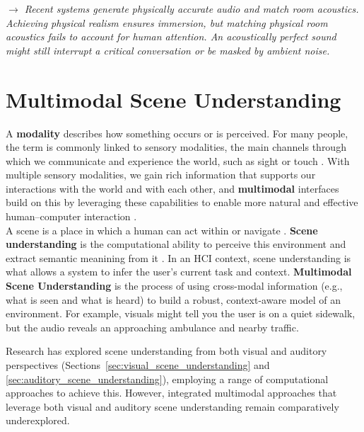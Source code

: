\textit{$\rightarrow$ Recent systems generate physically accurate audio and match room acoustics. Achieving physical realism ensures immersion, but matching physical room acoustics fails to account for human attention. An acoustically perfect sound might still interrupt a critical conversation or be masked by ambient noise.}

\section{Multimodal Scene Understanding}
A \textbf{modality} describes how something occurs or is perceived. For many people, the term is commonly linked to sensory modalities, the main channels through which we communicate and experience the world, such as sight or touch \cite{Baltr_10_MultimodalTaxanomy}.
With multiple sensory modalities, we gain rich information that supports our interactions with the world and with each other, and \textbf{multimodal} interfaces build on this by leveraging these capabilities to enable more natural and effective human–computer interaction \cite{Turk_14_MultimodalReview}.\\
A scene is a place in which a human can act within or navigate \cite{Xiao_13_SceneUndersandingDefApproaches}.
\textbf{Scene understanding} is the computational ability to perceive this environment and extract semantic meanining from it \cite{Aarthi_17_SceneUnderstandingDef}. In an HCI context, scene understanding is what allows a system to infer the user's current task and context.
\textbf{Multimodal Scene Understanding} is the process of using cross-modal information (e.g., what is seen and what is heard) to build a robust, context-aware model of an environment. For example, visuals might tell you the user is on a quiet sidewalk, but the audio reveals an approaching ambulance and nearby traffic. %

Research has explored scene understanding from both visual and auditory perspectives (Sections~\ref{sec:visual_scene_understanding} and \ref{sec:auditory_scene_understanding}), employing a range of computational approaches to achieve this. However, integrated multimodal approaches that leverage both visual and auditory scene understanding remain comparatively underexplored.

